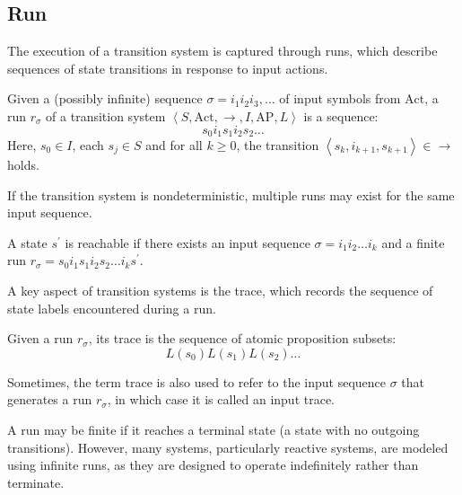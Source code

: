 \subsection{Run}
The execution of a transition system is captured through runs, which describe sequences of state transitions in response to input actions.
\begin{definition}
    Given a (possibly infinite) sequence $\sigma = i_1i_2i_3, \dots$ of input symbols from $\text{Act}$, a run $r_\sigma$ of a transition system $\left\langle S,\text{Act},\rightarrow,I,\text{AP},L\right\rangle$ is a sequence: 
    \[s_0i_1s_1i_2s_2\dots\] 
    Here, $s_0\in I$, each $s_j \in S$ and for all $k \geq 0$, the transition $\left\langle s_k, i_{k+1}, s_{k+1}\right\rangle\in\rightarrow$ holds.
\end{definition}
\noindent If the transition system is nondeterministic, multiple runs may exist for the same input sequence.
\begin{definition}
    A state $s^\prime$ is reachable if there exists an input sequence $\sigma = i_1i_2\dots i_k$ and a finite run $r_\sigma = s_0 i_1 s_1 i_2 s_2 \dots i_k s^\prime$.
\end{definition}

\noindent A key aspect of transition systems is the trace, which records the sequence of state labels encountered during a run.
\begin{definition}
    Given a run $r_\sigma$, its trace is the sequence of atomic proposition subsets:
    \[L(s_0) L(s_1) L(s_2)\dots\]
\end{definition}
\noindent Sometimes, the term trace is also used to refer to the input sequence $\sigma$ that generates a run $r_\sigma$, in which case it is called an input trace.

A run may be finite if it reaches a terminal state (a state with no outgoing transitions).
However, many systems, particularly reactive systems, are modeled using infinite runs, as they are designed to operate indefinitely rather than terminate.